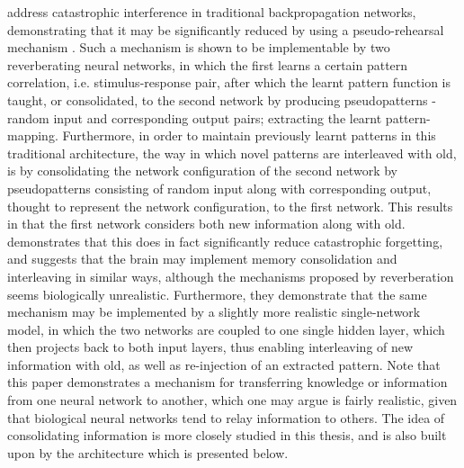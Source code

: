 \cite{Ans1997} address catastrophic interference in traditional backpropagation networks, demonstrating that it may be significantly reduced by using a pseudo-rehearsal mechanism \citep{Robins1995, Robins1996}. Such a mechanism is shown to be implementable by two reverberating neural networks, in which the first learns a certain pattern correlation, i.e. stimulus-response pair, after which the learnt pattern function is taught, or consolidated, to the second network by producing pseudopatterns - random input and corresponding output pairs; extracting the learnt pattern-mapping. Furthermore, in order to maintain previously learnt patterns in this traditional architecture, the way in which novel patterns are interleaved with old, is by consolidating the network configuration of the second network by pseudopatterns consisting of random input along with corresponding output, thought to represent the network configuration, to the first network. This results in that the first network considers both new information along with old. \cite{Ans1997} demonstrates that this does in fact significantly reduce catastrophic forgetting, and suggests that the brain may implement memory consolidation and interleaving in similar ways, although the mechanisms proposed by reverberation seems biologically unrealistic. Furthermore, they demonstrate that the same mechanism may be implemented by a slightly more realistic single-network model, in which the two networks are coupled to one single hidden layer, which then projects back to both input layers, thus enabling interleaving of new information with old, as well as re-injection of an extracted pattern. Note that this paper demonstrates a mechanism for transferring knowledge or information from one neural network to another, which one may argue is fairly realistic, given that biological neural networks tend to relay information to others. The idea of consolidating information is more closely studied in this thesis, and is also built upon by the architecture which is presented below.

